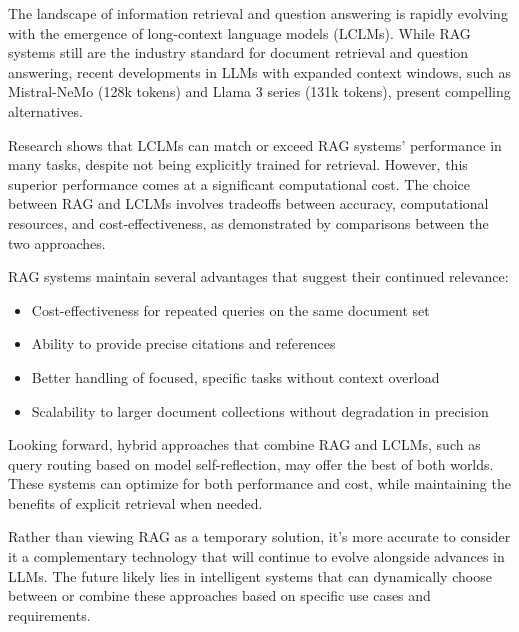 \documentclass[notoc, tikz]{tufte-handout}
\begin{document}
The landscape of information retrieval and question answering is rapidly evolving with the emergence of long-context language models (LCLMs). While RAG systems still are the industry standard for document retrieval and question answering, recent developments in LLMs with expanded context windows, such as Mistral-NeMo (128k tokens) and Llama 3 series (131k tokens), present compelling alternatives.

Research shows that LCLMs can match or exceed RAG systems' performance in many tasks, despite not being explicitly trained for retrieval\citep{lee2024can}. However, this superior performance comes at a significant computational cost. The choice between RAG and LCLMs involves tradeoffs between accuracy, computational resources, and cost-effectiveness, as demonstrated by comparisons between the two approaches\citep{li2024retrieval}.

RAG systems maintain several advantages that suggest their continued relevance:
\begin{itemize}
    \item Cost-effectiveness for repeated queries on the same document set
    \item Ability to provide precise citations and references
    \item Better handling of focused, specific tasks without context overload
    \item Scalability to larger document collections without degradation in precision
\end{itemize}

Looking forward, hybrid approaches that combine RAG and LCLMs, such as query routing based on model self-reflection\citep{li2024retrieval}, may offer the best of both worlds. These systems can optimize for both performance and cost, while maintaining the benefits of explicit retrieval when needed.

Rather than viewing RAG as a temporary solution, it's more accurate to consider it a complementary technology that will continue to evolve alongside advances in LLMs. The future likely lies in intelligent systems that can dynamically choose between or combine these approaches based on specific use cases and requirements.



\end{document}
